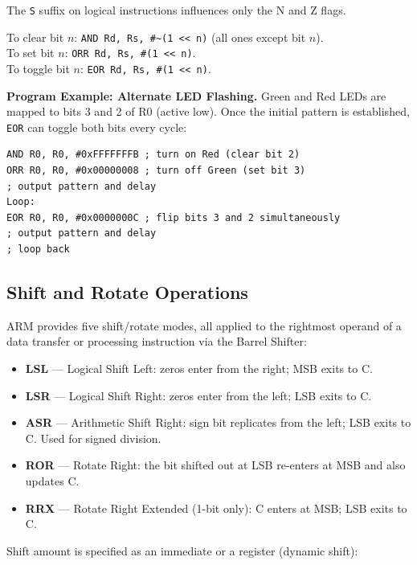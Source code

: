 \documentclass[11pt, a4paper, notitlepage]{report}
\theoremstyle{definition}
\theoremstyle{remark}
\theoremstyle{definition}
\begin{document}
The \texttt{S} suffix on logical instructions influences only the N and Z flags.

\begin{examtip}[title={Bit-Manipulation Masks}]
To clear bit $n$: \texttt{AND Rd, Rs, \#\~{}(1 << n)} (all ones except bit $n$).\\
To set bit $n$: \texttt{ORR Rd, Rs, \#(1 << n)}.\\
To toggle bit $n$: \texttt{EOR Rd, Rs, \#(1 << n)}.
\end{examtip}

\textbf{Program Example: Alternate LED Flashing.} Green and Red LEDs are mapped to bits 3 and 2 of R0 (active low). Once the initial pattern is established, \texttt{EOR} can toggle both bits every cycle:

\begin{lstlisting}
AND R0, R0, #0xFFFFFFFB ; turn on Red (clear bit 2)
ORR R0, R0, #0x00000008 ; turn off Green (set bit 3)
; output pattern and delay
Loop:
EOR R0, R0, #0x0000000C ; flip bits 3 and 2 simultaneously
; output pattern and delay
; loop back
\end{lstlisting}

\subsection{Shift and Rotate Operations}

ARM provides five shift/rotate modes, all applied to the rightmost operand of a data transfer or processing instruction via the Barrel Shifter:

\begin{itemize}
  \item \textbf{LSL} --- Logical Shift Left: zeros enter from the right; MSB exits to C\@.
  \item \textbf{LSR} --- Logical Shift Right: zeros enter from the left; LSB exits to C\@.
  \item \textbf{ASR} --- Arithmetic Shift Right: sign bit replicates from the left; LSB exits to C\@. Used for signed division.
  \item \textbf{ROR} --- Rotate Right: the bit shifted out at LSB re-enters at MSB and also updates C\@.
  \item \textbf{RRX} --- Rotate Right Extended (1-bit only): C enters at MSB; LSB exits to C\@.
\end{itemize}

Shift amount is specified as an immediate or a register (dynamic shift):
\end{document}
